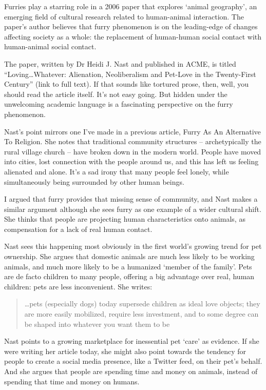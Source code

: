 
Furries play a starring role in a 2006 paper that explores `animal geography', an emerging field of cultural research related to human-animal interaction. The paper's author believes that furry phenomenon is on the leading-edge of changes affecting society as a whole: the replacement of human-human social contact with human-animal social contact.

The paper, written by Dr Heidi J. Nast and published in ACME, is titled ``Loving\ldots  Whatever: Alienation, Neoliberalism and Pet-Love in the Twenty-First Century'' (link to full text). If that sounds like tortured prose, then, well, you should read the article itself. It's not easy going. But hidden under the unwelcoming academic language is a fascinating perspective on the furry phenomenon.

Nast's point mirrors one I've made in a previous article, Furry As An Alternative To Religion. She notes that traditional community structures -- archetypically the rural village church -- have broken down in the modern world. People have moved into cities, lost connection with the people around us, and this has left us feeling alienated and alone. It's a sad irony that many people feel lonely, while simultaneously being surrounded by other human beings.

I argued that furry provides that missing sense of community, and Nast makes a similar argument although she sees furry as one example of a wider cultural shift. She thinks that people are projecting human characteristics onto animals, as compensation for a lack of real human contact.

Nast sees this happening most obviously in the first world's growing trend for pet ownership. She argues that domestic animals are much less likely to be working animals, and much more likely to be a humanized `member of the family'. Pets are de facto children to many people, offering a big advantage over real, human children: pets are less inconvenient. She writes:

\begin{quote}
  \ldots pets (especially dogs) today supersede children as ideal love objects; they are more easily mobilized, require less investment, and to some degree can be shaped into whatever you want them to be
\end{quote}

Nast points to a growing marketplace for inessential pet `care' as evidence. If she were writing her article today, she might also point towards the tendency for people to create a social media presence, like a Twitter feed, on their pet's behalf. And she argues that people are spending time and money on animals, instead of spending that time and money on humans.

